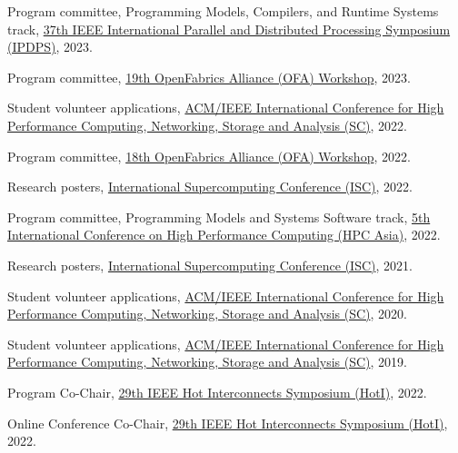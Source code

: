 \documentclass[11pt,article,oneside]{memoir}
\begin{document}
\ind Program committee, Programming Models, Compilers, and Runtime Systems track, \href{https://www.ipdps.org/ipdps2023}{37th IEEE International Parallel and Distributed Processing Symposium (IPDPS)}, 2023.
\vspace{0.01in}

\ind Program committee, \href{https://www.openfabrics.org/2023-ofa-workshop/}{19th OpenFabrics Alliance (OFA) Workshop}, 2023.
\vspace{0.01in}

\ind Student volunteer applications, \href{https://sc22.supercomputing.org/}{ACM/IEEE International Conference for High Performance Computing, Networking, Storage and Analysis (SC)}, 2022.
\vspace{0.01in}

\ind Program committee, \href{https://www.openfabrics.org/2022-ofa-workshop/}{18th OpenFabrics Alliance (OFA) Workshop}, 2022.
\vspace{0.01in}

\ind Research posters, \href{https://www.isc-hpc.com/isc-committees.html}{International Supercomputing Conference (ISC)}, 2022.
\vspace{0.01in}

\ind Program committee, Programming Models and Systems Software track, \href{http://sighpc.ipsj.or.jp/HPCAsia2022/}{5th International Conference on High Performance Computing (HPC Asia)}, 2022.
\vspace{0.01in}

\ind Research posters, \href{https://www.isc-hpc.com/isc-committees.html}{International Supercomputing Conference (ISC)}, 2021.
\vspace{0.01in}

\ind Student volunteer applications, \href{https://sc20.supercomputing.org/}{ACM/IEEE International Conference for High Performance Computing, Networking, Storage and Analysis (SC)}, 2020.

\ind Student volunteer applications, \href{https://sc19.supercomputing.org/}{ACM/IEEE International Conference for High Performance Computing, Networking, Storage and Analysis (SC)}, 2019.

\medskip

\ind Program Co-Chair, \href{https://hoti.org/}{29th IEEE Hot Interconnects Symposium (HotI)}, 2022.

\ind Online Conference Co-Chair, \href{https://hoti.org/}{29th IEEE Hot Interconnects Symposium (HotI)}, 2022.
\end{document}
